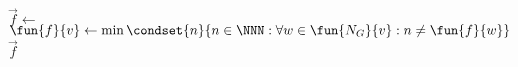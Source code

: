 \begin{algorithmic}
\State $\vec{f}\gets$
\State $\fun{f}{v}\gets\min\condset{n}{n\in\NNN:\forall w\in\fun{N_G}{v}:n\neq\fun{f}{w}}$
\EndFor
\Return $\vec{f}$
\EndFunction
\end{algorithmic}